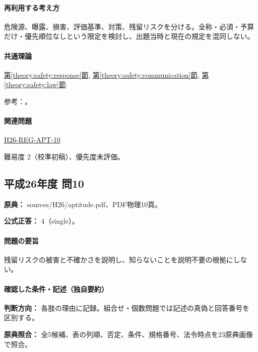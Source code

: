 \paragraph{再利用する考え方} 危険源、曝露、損害、評価基準、対策、残留リスクを分ける。全称・必須・予算だけ・優先順位なしという限定を検討し、出題当時と現在の規定を混同しない。

\paragraph{共通理論} \hyperref[theory:safety:response]{第\ref*{theory:safety:response}節}, \hyperref[theory:safety:communication]{第\ref*{theory:safety:communication}節}, \hyperref[theory:safety:law]{第\ref*{theory:safety:law}節}

\par 参考：\cite{saf_ra2006,saf_fsc_glossary}。

\paragraph{関連問題} \hyperref[q:h26-reg-apt-10]{H26-REG-APT-10}

\par 難易度 2（校準初稿）、優先度未評価。

\subsection{平成26年度 問10}
\label{q:h26-reg-apt-10}

\noindent\textbf{原典：} sources/H26/aptitude.pdf、PDF物理10頁。

\textbf{公式正答：} 4（single）。

\paragraph{問題の要旨} 残留リスクの被害と不確かさを説明し、知らないことを説明不要の根拠にしない。

\paragraph{確認した条件・記述（独自要約）}\mbox{}\par

\noindent\textbf{判断方向：} 各肢の理由に記録。組合せ・個数問題では記述の真偽と回答番号を区別する。\par

\noindent\textbf{原典照合：} 全5候補、表の列順、否定、条件、規格番号、法令時点を23原典画像で照合。\par

